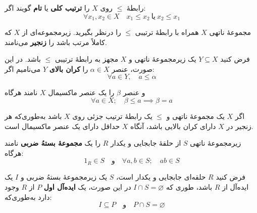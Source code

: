 \begin{definition}
    رابطهٔ $\leq$ روی $X$ را \textbf{ترتیب کلی}  یا  \textbf{تام} گویند اگر:
    \[
        \forall x_1, x_2 \in X \quad x_1 \leq x_2 \ \text{یا} \ x_2 \leq x_1
    \]
\end{definition}

\begin{definition}[زنجیر]
    مجموعهٔ ناتهی  $X$  همراه با رابطهٔ ترتیبی $\leq$ را درنظر بگیرید. زیرمجموعه‌ای از $X$ که کاملاً مرتب باشد  را \textbf{زنجیر}   می‌نامند.
\end{definition}

\begin{definition}
    فرض کنید $Y \subseteq X$ یک زیرمجموعهٔ ناتهی و $X$ مجهز به رابطهٔ ترتیبی $\leq$ باشد. در این صورت، عنصر $\alpha \in X$ را \textbf{کران بالای} $Y$ می‌نامیم اگر:
    \[
        \forall a \in Y, \quad a \leq \alpha
    \]

    و عنصر $\beta$  را یک عنصر ماکسیمال \(X\) نامند هرگاه
    \[
        \forall a \in X ;\quad \beta \leq a \implies \beta = a
    \]
\end{definition}

\begin{theorem}[لِم زورن]
    اگر $X$ یک مجموعهٔ ناتهی و $\leq$ یک رابطهٔ ‌ترتیب جزئی روی $X$ باشد به‌طوری‌که
    هر زنجیر در $X$ دارای کران بالایی باشد، آنگاه $X$ حداقل دارای یک عنصر ماکسیمال است.
\end{theorem}


\begin{definition}
    زیرمجموعهٔ ناتهی $S$ از حلقهٔ جابجایی و یکدار $R$ را یک \textbf{مجموعهٔ بستهُ ضربی} نامند هرگاه:
    \[
        1_R \in S \quad \text{و} \quad \forall a, b \in S; \quad ab \in S
    \]
\end{definition}

\begin{theorem}
    فرض کنید $R$ حلقه‌ای جابجایی و یکدار است، $S$ یک زیرمجموعهٔ بستهُ ضربی و $I$ یک ایده‌آل از $R$ باشد، طوری که \(I \cap S = \varnothing\)
    در این صورت، یک \textbf{ایده‌آل اول} $P$ از $R$ وجود دارد به‌طوری‌که:
    \[
        I \subseteq P \quad \text{و} \quad P \cap S = \varnothing
    \]
\end{theorem}

